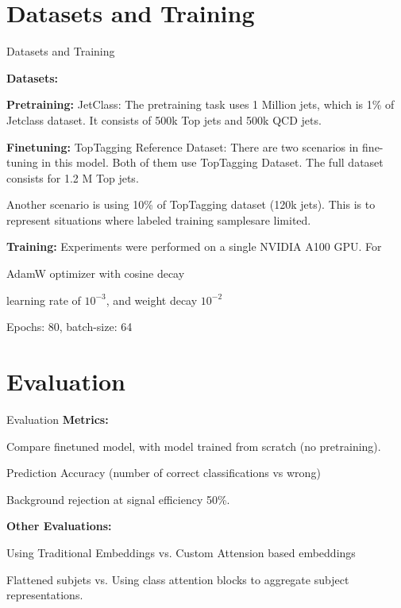 \documentclass[10pt]{beamer}
\let\olditemize\itemize
\let\endolditemize\enditemize
\renewenvironment{itemize}{
  \olditemize[<+->] %
}{\endolditemize}
\begin{document}
\section{Datasets and Training}
\begin{frame}{Datasets and Training}

\textbf{Datasets:}
\vspace{1em}

  \textbf{Pretraining:} JetClass: The pretraining task uses 1 Million jets, which is 1\% of Jetclass dataset.
It consists of 500k Top jets and 500k QCD jets.

\textbf{Finetuning:}
  TopTagging Reference Dataset:
      There are two scenarios in fine-tuning in this model. Both of
      them use TopTagging Dataset. The full dataset consists for 1.2 M Top jets.

      Another scenario is using 10\% of TopTagging dataset (120k jets). This is to
      represent situations where labeled training samplesare limited.

\vspace{2em}
\textbf{Training:}
 Experiments were performed on a single NVIDIA A100 GPU. For
 \begin{itemize}
   \item AdamW optimizer with cosine decay
   \item learning rate of $10^{-3}$, and weight decay $10^{-2}$
   \item Epochs: 80, batch-size: 64
 \end{itemize}

\end{frame}

\section{Evaluation}

\begin{frame}{Evaluation}
\textbf{Metrics:}

\begin{itemize}
  \item Compare finetuned model, with model trained from scratch (no pretraining).
  \item Prediction Accuracy (number of correct classifications vs wrong)
  \item Background rejection at signal efficiency 50\%.
\end{itemize}


\textbf{Other Evaluations:}

\begin{itemize}
  \item Using Traditional Embeddings vs. Custom Attension based embeddings
  \item Flattened subjets vs. Using class attention blocks to aggregate subject representations.
\end{itemize}

\end{frame}
\end{document}
